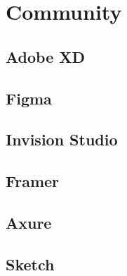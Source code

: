 \section{Community}

\subsection{Adobe XD}
\subsection{Figma}
\subsection{Invision Studio}
\subsection{Framer}
\subsection{Axure}
\subsection{Sketch}
